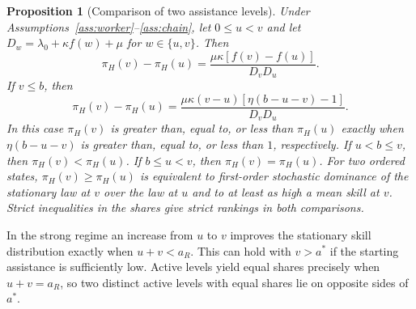 \documentclass[11pt]{article}
\newtheorem{proposition}{Proposition}
\theoremstyle{definition}
\newcommand{\share}{\pi_H}
\newcommand{\peak}{a^*}
\newcommand{\ret}{a_R}
\begin{document}
\begin{proposition}[Comparison of two assistance levels]\label{prop:pairwise}
Under Assumptions~\ref{ass:worker}--\ref{ass:chain}, let $0\leq u<v$
and let $D_w=\lambda_0+\kappa f(w)+\mu$ for $w\in\{u,v\}$. Then
\begin{equation}\label{eq:globaldiff}
 \share(v)-\share(u)=\frac{\mu\kappa[f(v)-f(u)]}{D_vD_u}.
\end{equation}
If $v\leq b$, then
\begin{equation}\label{eq:pairwise}
 \share(v)-\share(u)=
 \frac{\mu\kappa(v-u)[\eta(b-u-v)-1]}{D_vD_u}.
\end{equation}
In this case $\share(v)$ is greater than, equal to, or less than $\share(u)$
exactly when $\eta(b-u-v)$ is greater than, equal to, or less than $1$,
respectively. If $u<b\leq v$, then $\share(v)<\share(u)$. If $b\leq u<v$,
then $\share(v)=\share(u)$. For two ordered states, $\share(v)\geq\share(u)$
is equivalent to first-order stochastic dominance of the stationary law
at $v$ over the law at $u$ and to at least as high a mean skill at $v$.
Strict inequalities in the shares give strict rankings in both comparisons.
\end{proposition}

In the strong regime an increase from $u$ to $v$ improves the stationary
skill distribution exactly when $u+v<\ret$. This can hold with $v>\peak$
if the starting assistance is sufficiently low. Active levels yield
equal shares precisely when $u+v=\ret$, so two distinct active levels with
equal shares lie on opposite sides of $\peak$.
\end{document}
